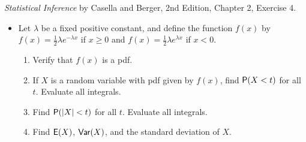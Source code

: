 \documentclass[12pt]{article}
\newcommand{\Prob}{{\sf P}}
\newcommand{\E}{{\sf E}}
\newcommand{\Var}{{\sf Var}}
\newenvironment{problem}[2][Problem]{\begin{trivlist}
\item[\hskip \labelsep {\bfseries #1}\hskip \labelsep {\bfseries #2.}]}
{\end{trivlist}}
\begin{document}
\begin{problem}{3} 
  \textit{Statistical Inference} by Casella and Berger, 2nd Edition, Chapter 2, 
  Exercise 4.
  \begin{itemize}
    \item[4.] Let $\lambda$ be a fixed positive constant, and define the function
    $f(x)$ by $f(x) = \frac12 \lambda e^{-\lambda x}$ if $x \ge 0$ and
    $f(x) = \frac12 \lambda e^{\lambda x}$ if $x < 0$.
    \begin{enumerate}
      \item Verify that $f(x)$ is a pdf.
      \item If $X$ is a random variable with pdf given by $f(x)$, find
      $\Prob(X < t)$ for all $t$. Evaluate all integrals.
      \item Find $\Prob(|X| < t)$ for all $t$. Evaluate all integrals.
      \item Find $\E(X)$, $\Var(X)$, and the standard deviation of $X$.
    \end{enumerate}


\end{itemize}
\end{problem}
\end{document}
